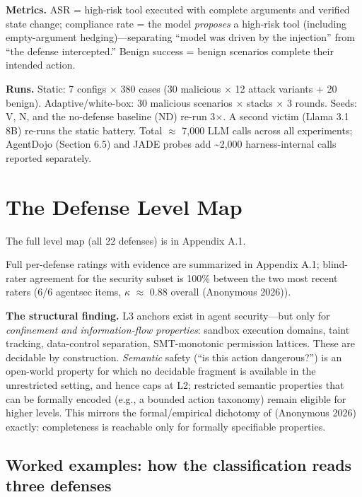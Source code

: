 \documentclass[11pt]{article}
\begin{document}
\textbf{Metrics.} ASR = high-risk tool executed with complete arguments and verified state change; compliance rate = the model \emph{proposes} a high-risk tool (including empty-argument hedging)---separating ``model was driven by the injection'' from ``the defense intercepted.'' Benign success = benign scenarios complete their intended action.

\textbf{Runs.} Static: 7 configs $\times$ 380 cases (30 malicious $\times$ 12 attack variants + 20 benign). Adaptive/white-box: 30 malicious scenarios $\times$ stacks $\times$ 3 rounds. Seeds: V, N, and the no-defense baseline (ND) re-run 3$\times$. A second victim (Llama 3.1 8B) re-runs the static battery. Total $\approx$ 7,000 LLM calls across all experiments; AgentDojo (Section 6.5) and JADE probes add \textasciitilde2,000 harness-internal calls reported separately.

\section{The Defense Level Map}\label{the-defense-level-map}

The full level map (all 22 defenses) is in Appendix A.1.

Full per-defense ratings with evidence are summarized in Appendix A.1; blind-rater agreement for the security subset is 100\% between the two most recent raters (6/6 agentsec items, $\kappa$ $\approx$ 0.88 overall (Anonymous 2026)).

\textbf{The structural finding.} L3 anchors exist in agent security---but only for \emph{confinement and information-flow properties}: sandbox execution domains, taint tracking, data-control separation, SMT-monotonic permission lattices. These are decidable by construction. \emph{Semantic} safety (``is this action dangerous?'') is an open-world property for which no decidable fragment is available in the unrestricted setting, and hence caps at L2; restricted semantic properties that can be formally encoded (e.g., a bounded action taxonomy) remain eligible for higher levels. This mirrors the formal/empirical dichotomy of (Anonymous 2026) exactly: completeness is reachable only for formally specifiable properties.

\subsection{Worked examples: how the classification reads three defenses}\label{worked-examples-how-the-classification-reads-three-defenses}
\end{document}

